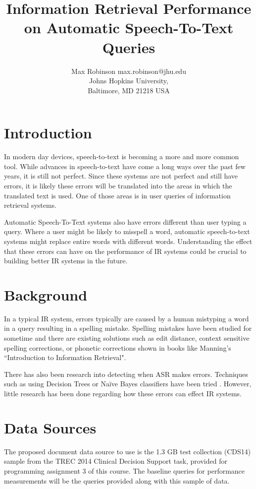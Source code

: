 \documentclass[jair, twoside,11pt,theapa]{article}
\begin{document}
\title{Information Retrieval Performance on Automatic Speech-To-Text Queries}
\author{\name Max Robinson \email max.robinson@jhu.edu \\
       \addr Johns Hopkins University,\\
       Baltimore, MD 21218 USA
}

\maketitle

\vspace{-1cm}
\section{Introduction}
In modern day devices, speech-to-text is becoming a more and more common tool. While advances in speech-to-text have come a long ways over the past few years, it is still not perfect. Since these systems are not perfect and still have errors, it is likely these errors will be translated into the areas in which the translated text is used. One of those areas is in user queries of information retrieval systems.

Automatic Speech-To-Text systems also have errors different than user typing a query. Where a user might be likely to misspell a word, automatic speech-to-text systems might replace entire words with different words. Understanding the effect that these errors can have on the performance of IR systems could be crucial to building better IR systems in the future. 


\section{Background}
In a typical IR system, errors typically are caused by a human mistyping a word in a query resulting in a spelling mistake. Spelling mistakes have been studied for sometime and there are existing solutions such as edit distance, context sensitive spelling corrections, or phonetic corrections shown in books like Manning's ``Introduction to Information Retrieval". 

There has also been research into detecting when ASR makes errors. Techniques such as using Decision Trees or Na{\"i}ve Bayes classifiers have been tried \cite{ErrorsASR}. However, little research has been done regarding how these errors can effect IR systems. 


\section{Data Sources}
The proposed document data source to use is the 1.3 GB test collection (CDS14) sample from the TREC 2014 Clinical Decision Support \cite{TREC2014} task, provided for programming assignment 3 of this course. The baseline queries for performance measurements will be the queries provided along with this sample of data. 
\end{document}
